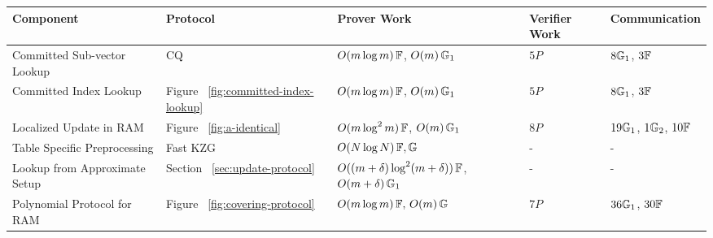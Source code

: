 \begin{table}[bt]
    \begin{tabular}{l|l|l|l|l}
        \hline
        {\bf Component  }                                                                                      & {\bf Protocol} & {\bf Prover Work}      & {\bf Verifier Work} & {\bf Communication}   \\ \hline
        Committed Sub-vector Lookup                                                                     & CQ ~\cite{EPRINT:EagFioGab22}      & $O(m \log m)\,\mathbb{F}$, $O(m)\,\mathbb{G}_1$      & $5P$            & $8\mathbb{G}_1$, $3\mathbb{F}$         \\ \hline
        Committed Index Lookup                                                                          & Figure ~\ref{fig:committed-index-lookup}    & $O(m \log m)\,\mathbb{F}$, $O(m)\,\mathbb{G}_1$      & $5P$            & $8\mathbb{G}_1$, $3\mathbb{F}$         \\ \hline
        Localized Update in RAM                                                                                & Figure ~\ref{fig:a-identical}   & $O(m \log^2 m)\, \mathbb{F}$, $O(m)\,\mathbb{G}_1$      & $8P$            & $19\mathbb{G}_1$, $1\mathbb{G}_2$, $10\mathbb{F}$ \\ \hline
        Table Specific Preprocessing                                                                    & Fast KZG ~\cite{EPRINT:FeiKho23}      & $O(N \log N)\,\mathbb{F},\mathbb{G}$      & -             & -               \\ \hline
        Lookup from Approximate Setup                                                                   & Section ~\ref{sec:update-protocol}    & $O((m+\delta)\log^2(m+\delta))\,\mathbb{F}$, $O(m+\delta)\,\mathbb{G}_1$ & -             & -               \\ \hline
        Polynomial Protocol for RAM                                                                     & Figure ~\ref{fig:covering-protocol}   & $O(m \log m)\,\mathbb{F},\, O(m)\,\mathbb{G}$      & $7P$            & $36\mathbb{G}_1$, $30\mathbb{F}$       \\ \hline

\end{tabular}
\end{table}
